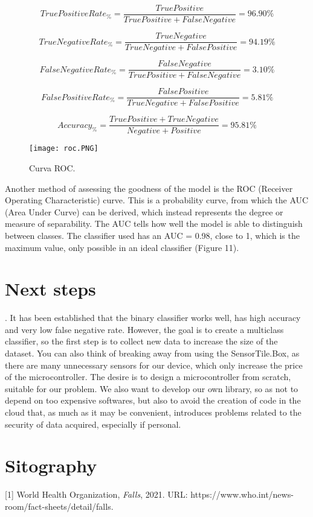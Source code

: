 \documentclass[12pt]{article}
\begin{document}
\begin{equation}
 {True Positive Rate_\%} = \frac{True Positive}{True Positive + False Negative} = 96.90\%
\end{equation}

\begin{equation}
{True Negative Rate_\%} = \frac{True Negative}{True Negative + False Positive} = 94.19\%
\end{equation}
   
\begin{equation}
 {False Negative Rate_\%} = \frac{False Negative}{True Positive + False Negative} = 3.10\%
\end{equation}

\begin{equation}
{False Positive Rate_\%} = \frac{False Positive}{True Negative + False Positive} = 5.81\%
\end{equation}    

\begin{equation}
{Accuracy_\%} = \frac{True Positive + True Negative}{Negative + Positive} = 95.81\%
\end{equation}

\begin{wrapfigure}{l}{0pt}
  \texttt{[image: roc.PNG]}
  \caption{Curva ROC.}
\end{wrapfigure}





Another method of assessing the goodness of the model is the ROC (Receiver Operating Characteristic) curve. 
This is a probability curve, from which the AUC (Area Under Curve) can be derived, which instead represents the degree or measure of separability. 
The AUC tells how well the model is able to distinguish between classes. The classifier used has an AUC = 0.98, close to 1, which is the maximum value, only possible in an ideal classifier (Figure 11).

\section*{\centering Next steps}.
It has been established that the binary classifier works well, has high accuracy and very low false negative rate.
However, the goal is to create a multiclass classifier, so the first step is to collect new data to increase the size of the dataset.
You can also think of breaking away from using the SensorTile.Box, as there are many unnecessary sensors for our device, which only increase the price of the microcontroller. The desire is to design a microcontroller from scratch, suitable for our problem.
We also want to develop our own library, so as not to depend on too expensive softwares, but also to avoid the creation of code in the cloud that, as much as it may be convenient, introduces problems related to the security of data acquired, especially if personal.

\section*{\centering Sitography}
[1] World Health Organization, \emph{Falls}, 2021. URL: https://www.who.int/news-room/fact-sheets/detail/falls.
\end{document}

